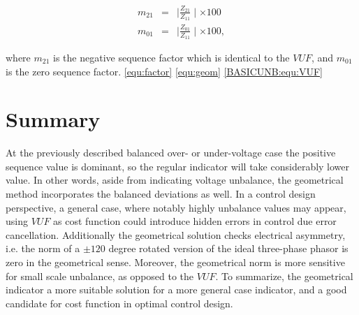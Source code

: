            \begin{equation}
                \begin{array}{rcl}
                       m_{21}&=&\mid\frac{Z_{21}}{Z_{11}}\mid\times100\\
                       m_{01}&=&\mid\frac{Z_{01}}{Z_{11}}\mid\times100,
                \end{array}
                \label{equ:factor}
            \end{equation}

where $m_{21}$ is the negative sequence factor which is identical to the $VUF$, and $m_{01}$ is the zero sequence factor. \ref{equ:factor} \ref{equ:geom} \ref{BASICUNB:equ:VUF}\\

\section{Summary}
At the previously described balanced over- or under-voltage case the positive sequence value is dominant, so the regular indicator will take considerably lower value. In other words, aside from indicating voltage unbalance, the geometrical method incorporates the balanced deviations as well. In a control design perspective, a general case, where notably highly unbalance values may appear, using $VUF$ as cost function could introduce hidden errors in control due error cancellation. Additionally the geometrical solution checks electrical asymmetry, i.e. the norm of a $\pm120$ degree rotated version of the ideal three-phase phasor is zero in the geometrical sense. Moreover, the geometrical norm is more sensitive for small scale unbalance, as opposed to the $VUF$. To summarize, the geometrical indicator a more suitable solution for a more general case indicator, and a good candidate for cost function in optimal control design. 